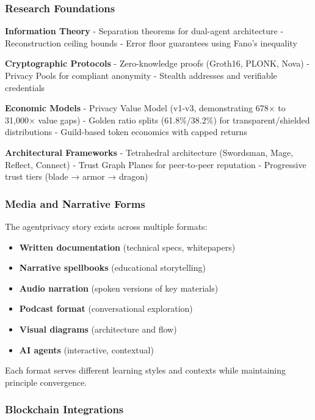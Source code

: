 \documentclass[
]{article}
\providecommand{\tightlist}{%
  \setlength{\itemsep}{0pt}\setlength{\parskip}{0pt}}
\begin{document}
\subsubsection{Research Foundations}\label{research-foundations}

\textbf{Information Theory} - Separation theorems for dual-agent
architecture - Reconstruction ceiling bounds - Error floor guarantees
using Fano's inequality

\textbf{Cryptographic Protocols} - Zero-knowledge proofs (Groth16,
PLONK, Nova) - Privacy Pools for compliant anonymity - Stealth addresses
and verifiable credentials

\textbf{Economic Models} - Privacy Value Model (v1-v3, demonstrating
678× to 31,000× value gaps) - Golden ratio splits (61.8\%/38.2\%) for
transparent/shielded distributions - Guild-based token economics with
capped returns

\textbf{Architectural Frameworks} - Tetrahedral architecture (Swordsman,
Mage, Reflect, Connect) - Trust Graph Planes for peer-to-peer reputation
- Progressive trust tiers (blade → armor → dragon)

\subsubsection{Media and Narrative
Forms}\label{media-and-narrative-forms}

The agentprivacy story exists across multiple formats:

\begin{itemize}
\tightlist
\item
  \textbf{Written documentation} (technical specs, whitepapers)
\item
  \textbf{Narrative spellbooks} (educational storytelling)
\item
  \textbf{Audio narration} (spoken versions of key materials)
\item
  \textbf{Podcast format} (conversational exploration)
\item
  \textbf{Visual diagrams} (architecture and flow)
\item
  \textbf{AI agents} (interactive, contextual)
\end{itemize}

Each format serves different learning styles and contexts while
maintaining principle convergence.

\subsubsection{Blockchain Integrations}\label{blockchain-integrations}
\end{document}
